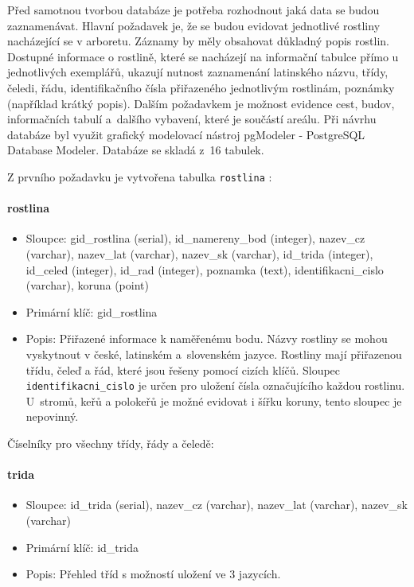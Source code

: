 \documentclass[12pt]{article}%
\begin{document}
{{%
Před samotnou tvorbou databáze je potřeba rozhodnout jaká data se budou zaznamenávat. Hlavní požadavek
je, že se budou evidovat jednotlivé rostliny nacházející se v arboretu. Záznamy by měly obsahovat důkladný 
popis rostlin. Dostupné informace o rostlině, které se nacházejí na informační tabulce přímo u jednotlivých
exemplářů, ukazují nutnost zaznamenání latinského názvu, třídy, čeledi, řádu, identifikačního čísla 
přiřazeného jednotlivým rostlinám, poznámky (například krátký popis). Dalším požadavkem je možnost 
evidence cest, budov, informačních tabulí a~dalšího vybavení, které je součástí areálu. 
Při návrhu databáze byl využit grafický modelovací nástroj pgModeler - PostgreSQL Database Modeler. 
Databáze se skladá z~16 tabulek.


Z prvního požadavku je vytvořena tabulka \texttt{rostlina} :
\paragraph{rostlina}
\begin{itemize}
\item Sloupce: gid\_rostlina (serial), id\_namereny\_bod (integer), nazev\_cz (varchar),
nazev\_lat (varchar), nazev\_sk (varchar), id\_trida (integer), id\_celed (integer), id\_rad (integer),
poznamka (text), identifikacni\_cislo (varchar), koruna (point)
\item Primární klíč: gid\_rostlina
\item Popis: Přiřazené informace k naměřenému bodu. Názvy rostliny se mohou vyskytnout v české, latinském 
a~slovenském jazyce. Rostliny mají přiřazenou třídu, čeleď a řád, které jsou řešeny pomocí cizích klíčů.
Sloupec \texttt{identifikacni\_cislo} je určen pro uložení čísla označujícího každou rostlinu. U~stromů, keřů a polokeřů
je možné evidovat i šířku koruny, tento sloupec je nepovinný.
\end{itemize}

\obrazek
{}

Číselníky pro všechny třídy, řády a čeledě:
\paragraph{trida}
\begin{itemize}
\item Sloupce: id\_trida (serial), nazev\_cz (varchar), nazev\_lat (varchar), nazev\_sk (varchar)
\item Primární klíč: id\_trida
\item Popis: Přehled tříd s možností uložení ve 3 jazycích.
\end{itemize}

}}
\end{document}
